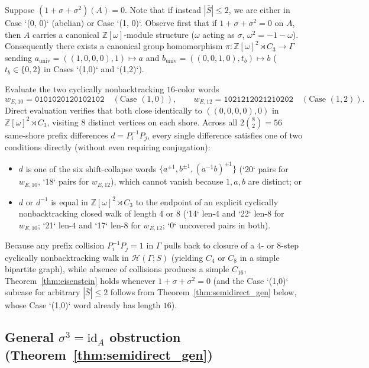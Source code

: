 \documentclass[11pt]{amsart}
\theoremstyle{definition}
\theoremstyle{remark}
\newcommand{\Z}{\mathbb{Z}}
\newcommand{\Haar}{\mathcal{H}}
\newcommand{\id}{\mathrm{id}}
\begin{document}
Suppose $(1 + \sigma + \sigma^2)(A) = 0$. Note that if instead $|\bar{S}| \le 2$, we are either in Case `(0, 0)` (abelian) or Case `(1, 0)`. Observe first that if $1 + \sigma + \sigma^2 = 0$ on $A$, then $A$ carries a canonical $\Z[\omega]$-module structure ($\omega$ acting as $\sigma$, $\omega^2 = -1-\omega$). Consequently there exists a canonical group homomorphism $\pi : \Z[\omega]^2 \rtimes C_3 \to \Gamma$ sending $a_{\mathrm{univ}} = ((1,0,0,0), 1) \mapsto a$ and $b_{\mathrm{univ}} = ((0,0,1,0), t_b) \mapsto b$ ($t_b \in \{0,2\}$ in Cases `(1,0)` and `(1,2)`).

Evaluate the two cyclically nonbacktracking $16$-color words
\[
w_{E,10} = \mathtt{0101020120102102} \quad (\text{Case }(1,0)), \qquad
w_{E,12} = \mathtt{1021212021210202} \quad (\text{Case }(1,2)).
\]
Direct evaluation verifies that both close identically to $((0,0,0,0), 0)$ in $\Z[\omega]^2 \rtimes C_3$, visiting $8$ distinct vertices on each shore. Across all $2\binom{8}{2} = 56$ same-shore prefix differences $d = P_i^{-1} P_j$, every single difference satisfies one of two conditions directly (without even requiring conjugation):
\begin{itemize}
\item $d$ is one of the six shift-collapse words $\{a^{\pm 1}, b^{\pm 1}, (a^{-1}b)^{\pm 1}\}$ (`20` pairs for $w_{E,10}$, `18` pairs for $w_{E,12}$), which cannot vanish because $1, a, b$ are distinct; or
\item $d$ or $d^{-1}$ is equal in $\Z[\omega]^2 \rtimes C_3$ to the endpoint of an explicit cyclically nonbacktracking closed walk of length $4$ or $8$ (`14` len-$4$ and `22` len-$8$ for $w_{E,10}$; `21` len-$4$ and `17` len-$8$ for $w_{E,12}$; `0` uncovered pairs in both).
\end{itemize}
Because any prefix collision $P_i^{-1} P_j = 1$ in $\Gamma$ pulls back to closure of a $4$- or $8$-step cyclically nonbacktracking walk in $\Haar(\Gamma; S)$ (yielding $C_4$ or $C_8$ in a simple bipartite graph), while absence of collisions produces a simple $C_{16}$, Theorem~\ref{thm:eisenstein} holds whenever $1+\sigma+\sigma^2=0$ (and the Case `(1,0)` subcase for arbitrary $|\bar{S}| \le 2$ follows from Theorem~\ref{thm:semidirect_gen} below, whose Case `(1,0)` word already has length $16$).

\subsection{General $\sigma^3 = \id_A$ obstruction (Theorem~\ref{thm:semidirect_gen})}
\end{document}

